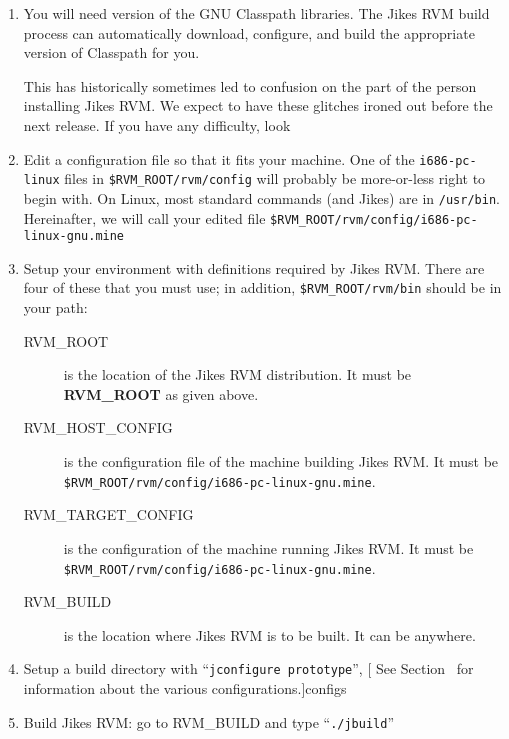 \begin{enumerate}
%
%
\item You will need version \classpathversion{} of the GNU Classpath
libraries.  The Jikes RVM build process can automatically download, 
configure, and build the appropriate version of Classpath for you.

This has historically sometimes led to confusion on the part of the
person installing Jikes RVM.  We expect to have these glitches ironed
out before the next release.  If you have any difficulty, look \AtManualClasspathRootDiscussion{}

\item Edit a configuration file so that it fits your machine.  One of
the {\tt i686-pc-linux} files in {\tt \$RVM\_ROOT/rvm/config} will probably be
more-or-less right to begin with.  On Linux, most standard commands
(and Jikes) are in {\tt /usr/bin}.  Hereinafter, we will call your edited
file {\tt \$RVM\_ROOT/rvm/config/i686-pc-linux-gnu.mine}

%
\item Setup your environment with definitions required by Jikes RVM.
There are four of these that you must use; in addition,
{\tt \$RVM\_ROOT/rvm/bin} should be in your path:

\begin{description}

\item[RVM\_ROOT] is the location of the Jikes RVM distribution.  It
must be {\bf RVM\_ROOT} as given above.

\item[RVM\_HOST\_CONFIG] is the configuration file of the machine
building Jikes RVM.  It must be
{\tt \$RVM\_ROOT/rvm/config/i686-pc-linux-gnu.mine}.

\item[RVM\_TARGET\_CONFIG] is the configuration of the machine running
Jikes RVM.  It must be {\tt \$RVM\_ROOT/rvm/config/i686-pc-linux-gnu.mine}.

\item[RVM\_BUILD] is the location where Jikes RVM is to be built.  It
can be anywhere.

\end{description}

\item Setup a build directory with ``{\tt jconfigure prototype}'', [  See Section~\Ref{}
for information about the various configurations.]{configs}

\item Build Jikes RVM: go to RVM\_BUILD and type ``{\tt ./jbuild}''

\end{enumerate}

